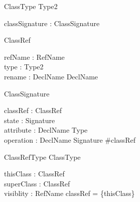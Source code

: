 \begin{sidebyside}
\begin{class}{ClassType}
  Type2\\
\begin{state}
  classSignature : ClassSignature
\end{state}
\end{class}
\nextside
\begin{class}{ClassRef}
\begin{state}
  refName : RefName\\
  type : \seq Type2 \\
  rename : DeclName \pfun DeclName
\end{state}
\end{class}
\end{sidebyside}
\begin{sidebyside}
\begin{class}{ClassSignature}
\begin{state}
  classRef : \finset ClassRef\\
  state : Signature\\
  attribute : DeclName \pfun Type\\
  operation : DeclName \pfun Signature
\where
  \#classRef 
\end{state}
\end{class}
\nextside
\begin{class}{ClassRefType}
  ClassType\\
\begin{state}
  thisClass : ClassRef\\
  superClass : \finset ClassRef\\
  visiblity : \finset RefName
\where
  classRef = \{thisClass\}
\end{state}  
\end{class}
\end{sidebyside}

